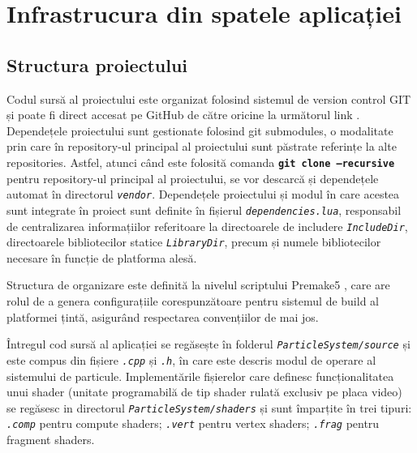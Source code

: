 \chapter{Infrastrucura din spatele aplicației}

\section{Structura proiectului}
Codul sursă al proiectului este organizat folosind sistemul de version control GIT \cite{GIT_citation} și poate fi direct accesat pe GitHub de către oricine la următorul link \cite{GithubRepository_citation}. Dependețele proiectului sunt gestionate folosind git submodules, o modalitate prin care în repository-ul principal al proiectului sunt păstrate referințe la alte repositories. Astfel, atunci când este folosită comanda \textbf{\texttt{git clone --recursive}} pentru repository-ul principal al proiectului, se vor descarcă și dependețele automat în directorul \textit{\texttt{vendor}}. Dependețele proiectului și modul în care acestea sunt integrate în proiect sunt definite în fișierul \textit{\texttt{dependencies.lua}}, responsabil de centralizarea informațiilor referitoare la directoarele de includere \textit{\texttt{IncludeDir}}, directoarele bibliotecilor statice \textit{\texttt{LibraryDir}}, precum și numele bibliotecilor necesare în funcție de platforma alesă. 

Structura de organizare este definită la nivelul scriptului Premake5 \cite{Premake5_citation}, care are rolul de a genera configurațiile corespunzătoare pentru sistemul de build al platformei țintă, asigurând respectarea convențiilor de mai jos. 

Întregul cod sursă al aplicației se regăsește în folderul \textit{\texttt{ParticleSystem/source}} și este compus din fișiere \textit{\texttt{.cpp}} și \textit{\texttt{.h}}, în care este descris modul de operare al sistemului de particule. Implementările fișierelor care definesc funcționalitatea unui shader (unitate programabilă de tip shader rulată exclusiv pe placa video) se regăsesc in directorul \textit{\texttt{ParticleSystem/shaders}} și sunt împarțite în trei tipuri: \textit{\texttt{.comp}} pentru compute shaders; \textit{\texttt{.vert}} pentru vertex shaders; \textit{\texttt{.frag}} pentru fragment shaders. 

